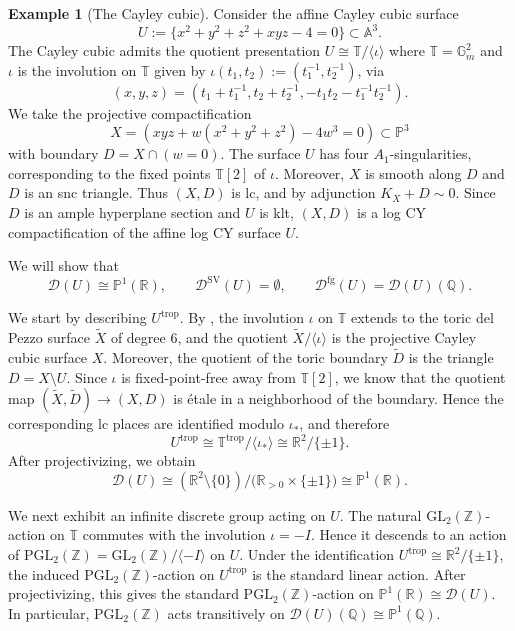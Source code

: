 \documentclass[reqno, 12pt]{amsart}
\theoremstyle{definition}
\newtheorem{expl}[prop]{Example}
\newcommand{\bP}{\mathbb{P}}
\newcommand{\bR}{\mathbb{R}}
\newcommand{\bA}{\mathbb{A}}
\newcommand{\bQ}{\mathbb{Q}}
\newcommand{\bZ}{\mathbb{Z}}
\newcommand{\bG}{\mathbb{G}}
\newcommand{\bT}{\mathbb{T}}
\newcommand{\tX}{\widetilde{X}}
\newcommand{\tD}{\widetilde{D}}
\newcommand{\cD}{\mathcal{D}}
\newcommand{\Aut}{\mathrm{Aut}}
\newcommand{\trop}{\mathrm{trop}}
\newcommand{\GL}{\mathrm{GL}}
\newcommand{\PGL}{\mathrm{PGL}}
\newcommand{\SV}{\mathrm{SV}}
\newcommand{\rfg}{\mathrm{fg}}
\numberwithin{equation}{section}
\begin{document}
\begin{expl}[The Cayley cubic]\label{ex:cayley-cubic}
Consider the affine Cayley cubic surface
\[
U:=\{x^2+y^2+z^2+xyz-4=0\}\subset \bA^3.
\]
The Cayley cubic admits the quotient presentation $U\cong \bT/\langle\iota\rangle$ where $\bT= \bG_m^2$ and $\iota$ is the involution on $\bT$ given by $\iota(t_1,t_2):=(t_1^{-1},t_2^{-1})$,
via
\[
(x,y,z)=(t_1+t_1^{-1}, t_2+t_2^{-1}, -t_1 t_2-t_1^{-1}t_2^{-1}).
\]
We take the projective compactification
\[
X=
(xyz+w(x^2+y^2+z^2)-4w^3=0)
\subset\bP^3
\]
with boundary $D = X\cap (w=0)$. The surface $U$ has four $A_1$-singularities, corresponding to the
fixed points $\bT[2]$ of $\iota$. Moreover, $X$ is smooth along $D$
and $D$ is an snc triangle. Thus $(X,D)$ is lc, and by adjunction $K_X+D\sim 0$.
Since $D$ is an ample hyperplane section and $U$ is klt, $(X,D)$ is
a log CY compactification of the affine log CY surface $U$.

We will show that 
\[
\cD(U) \cong \bP^1(\bR), \qquad \cD^{\SV}(U) = \emptyset, \qquad \cD^{\rfg}(U) = \cD(U)(\bQ).
\]

We start by describing $U^{\trop}$. By \cite[Remark~1.1]{GHKS22}, the involution $\iota$ on $\bT$
extends to the toric del Pezzo surface $\widetilde X$ of degree $6$, and
the quotient $\widetilde X/\langle\iota\rangle$ is the projective Cayley cubic surface $X$. 
Moreover, the quotient of the toric boundary $\tD$ is the triangle
$D=X\setminus U$. 
Since $\iota$ is fixed-point-free away from $\bT[2]$, we know that the quotient map $(\tX,\tD) \to (X,D)$ is \'etale in a neighborhood of the boundary.  Hence the corresponding
lc places are identified modulo $\iota_*$, and therefore
\[
U^{\trop}\cong \bT^{\trop}/\langle \iota_*\rangle \cong \bR^2/\{\pm1\}.
\]
After projectivizing, we
obtain
\[
\cD(U)\cong
(\bR^2\setminus\{0\})/
\bigl(\bR_{>0}\times\{\pm1\}\bigr)
\cong \bP^1(\bR).
\]

We next exhibit an infinite discrete group acting on $U$.
The natural
$\GL_2(\bZ)$-action on $\bT$ commutes with the involution
$\iota=-I$. Hence it descends to  an action of $\PGL_2(\bZ)=\GL_2(\bZ)/\langle -I\rangle$ on  $U$. %
Under the identification $U^{\trop}\cong \bR^2/\{\pm1\}$, 
the induced $\PGL_2(\bZ)$-action on $U^{\trop}$ is the standard linear action. After projectivizing, this gives the standard $\PGL_2(\bZ)$-action on $\bP^1(\bR)\cong\cD(U)$.
In particular, $\PGL_2(\bZ)$ acts transitively on $\cD(U)(\bQ)\cong\bP^1(\bQ)$.


\end{expl}
\end{document}
